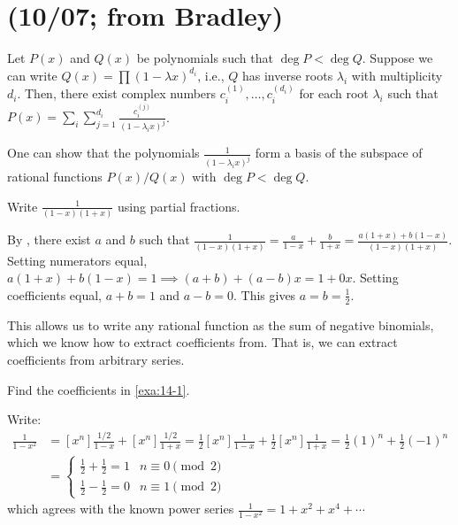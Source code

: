 \documentclass[class=math239,notes,tikz]{agony}
\begin{document}
\section{(10/07; from Bradley)}
\begin{theorem}[4.12]\label{thm:pf}
  Let $P(x)$ and $Q(x)$ be polynomials such that $\deg P < \deg Q$.
  Suppose we can write $Q(x) = \prod(1-\lambda x)^{d_i}$, i.e.,
  $Q$ has inverse roots $\lambda_i$ with multiplicity $d_i$.
  Then, there exist complex numbers $c_i^{(1)}, \dotsc, c_i^{(d_i)}$ for each root $\lambda_i$
  such that $P(x) = \sum\limits_{i}\sum\limits_{j=1}^{d_i}\frac{c_i^{(j)}}{(1-\lambda_i x)^j}$.
\end{theorem}
\begin{prf}[sketch]
  One can show that the polynomials $\frac{1}{(1-\lambda_i x)^j}$
  form a basis of the subspace of rational functions $P(x)/Q(x)$ with $\deg P < \deg Q$.
\end{prf}

\begin{example}\label{exa:14-1}
  Write $\frac{1}{(1-x)(1+x)}$ using partial fractions.
\end{example}
\begin{sol}
  By , there exist $a$ and $b$ such that
  $\frac{1}{(1-x)(1+x)} = \frac{a}{1-x} + \frac{b}{1+x} = \frac{a(1+x) + b(1-x)}{(1-x)(1+x)}$.
  Setting numerators equal, $a(1+x) + b(1-x) = 1 \implies (a+b) + (a-b)x = 1 + 0x$.
  Setting coefficients equal, $a+b = 1$ and $a-b = 0$.
  This gives $a = b = \frac12$.
\end{sol}

This allows us to write any rational function as the sum of negative binomials,
which we know how to extract coefficients from.
That is, we can extract coefficients from arbitrary series.

\begin{example}
  Find the coefficients in \cref{exa:14-1}.
\end{example}
\begin{sol}
  Write:
  \begin{align*}
    [x^n]\frac{1}{1-x^2}
     & = [x^n]\frac{1/2}{1-x} + [x^n]\frac{1/2}{1+x}
    = \frac12[x^n]\frac{1}{1-x} + \frac12[x^n]\frac{1}{1+x}
    = \frac12(1)^n + \frac12(-1)^n                   \\
     & = \begin{cases}
           \frac12+\frac12 = 1 & n \equiv 0 \pmod 2 \\
           \frac12-\frac12 = 0 & n \equiv 1 \pmod 2
         \end{cases}
  \end{align*}
  which agrees with the known power series $\frac{1}{1-x^2} = 1+x^2+x^4+\dotsb$
\end{sol}
\end{document}
